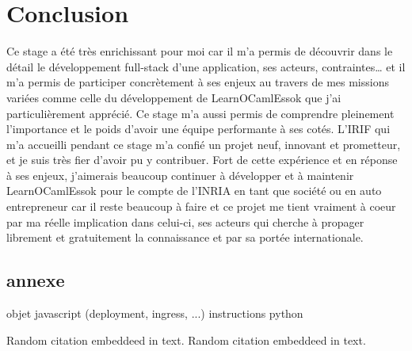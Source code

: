 \documentclass{article}
\begin{document}
\newpage

\section{Conclusion}

Ce stage a été très enrichissant pour moi car il m’a permis de découvrir dans le détail le développement full-stack d'une application, ses acteurs, contraintes… et il m’a permis de participer concrètement à ses enjeux au travers de mes missions variées comme celle du développement de LearnOCamlEssok que j’ai particulièrement apprécié. Ce stage m’a aussi permis de comprendre pleinement l'importance et le poids d'avoir une équipe performante à ses cotés.
\newline
L'IRIF qui m’a accueilli pendant ce stage m'a confié un projet neuf, innovant et prometteur, et je suis très fier d’avoir pu y contribuer.
\newline
\newline
Fort de cette expérience et en réponse à ses enjeux, j’aimerais beaucoup continuer à développer et à maintenir LearnOCamlEssok pour le compte de l'INRIA en tant que société ou en auto entrepreneur car il reste beaucoup à faire et ce projet me tient vraiment à coeur par ma réelle implication dans celui-ci, ses acteurs qui cherche à propager librement et gratuitement la connaissance et par sa portée internationale.




\newpage

\subsection{annexe}
objet javascript (deployment, ingress, ...)
instructions python



Random citation \cite{MISC:1} embeddeed in text.
Random citation \cite{MISC:intertech} embeddeed in text.
\end{document}
